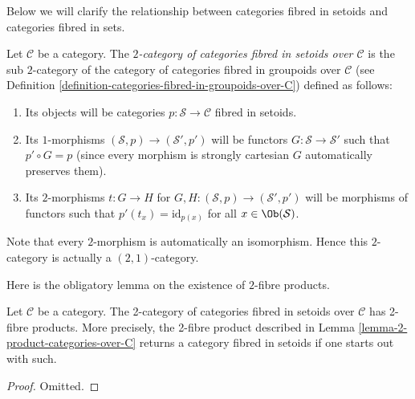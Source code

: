 \noindent
Below we will clarify the relationship between categories fibred in setoids
and categories fibred in sets.

\begin{definition}
\label{definition-categories-fibred-in-setoids-over-C}
Let $\mathcal{C}$ be a category.
The {\it $2$-category of categories fibred in setoids over $\mathcal{C}$}
is the sub $2$-category of the category of categories fibred in groupoids
over $\mathcal{C}$ (see
Definition \ref{definition-categories-fibred-in-groupoids-over-C})
defined as follows:
\begin{enumerate}
\item Its objects will be categories
$p : \mathcal{S} \to \mathcal{C}$ fibred in setoids.
\item Its $1$-morphisms $(\mathcal{S}, p) \to (\mathcal{S}', p')$
will be functors $G : \mathcal{S} \to \mathcal{S}'$ such that
$p' \circ G = p$ (since every morphism is strongly cartesian
$G$ automatically preserves them).
\item Its $2$-morphisms $t : G \to H$ for
$G, H : (\mathcal{S}, p) \to (\mathcal{S}', p')$
will be morphisms of functors
such that $p'(t_x) = \text{id}_{p(x)}$
for all $x \in \Ob(\mathcal{S})$.
\end{enumerate}
\end{definition}

\noindent
Note that every $2$-morphism is automatically an isomorphism.
Hence this $2$-category is actually a $(2, 1)$-category.

\noindent
Here is the obligatory lemma on the existence of $2$-fibre products.

\begin{lemma}
\label{lemma-2-product-categories-fibred-setoids}
Let $\mathcal{C}$ be a category.
The 2-category of categories fibred in setoids over $\mathcal{C}$
has 2-fibre products. More precisely, the 2-fibre product described in
Lemma \ref{lemma-2-product-categories-over-C} returns a category fibred in
setoids if one starts out with such.
\end{lemma}

\begin{proof}
Omitted.
\end{proof}

